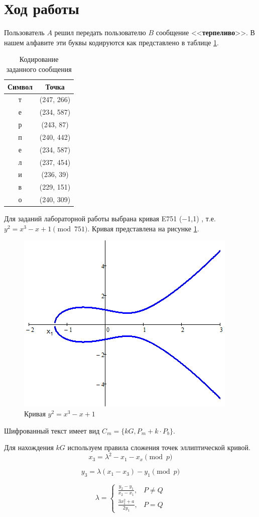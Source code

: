 \section{Ход работы}

Пользователь $A$ решил передать пользователю $B$ сообщение <<\textbf{терпеливо}>>. В нашем алфавите эти буквы кодируются как представлено в таблице \ref{tbl1}.

\begin{table}[H]
	\centering
	\caption{Кодирование заданного сообщения}
	\begin{tabular}{|c|c|}
		\hline
		Символ & Точка      \\ \hline
		т      & (247, 266) \\ \hline
		е      & (234, 587) \\ \hline
		р      & (243, 87)  \\ \hline
		п      & (240, 442) \\ \hline
		е      & (234, 587) \\ \hline
		л      & (237, 454) \\ \hline
		и      & (236, 39)  \\ \hline
		в      & (229, 151) \\ \hline
		о      & (240, 309) \\ \hline
	\end{tabular}
	\label{tbl1}
\end{table}

Для заданий лабораторной работы выбрана кривая E751 (−1,1) , т.е. $y^2 = x^3 − x +1 \pmod{751}$. Кривая представлена на рисунке \ref{fig:elcurve3}.

\begin{figure}[H]
	\centering
	\includegraphics[width=0.7\linewidth]{img/elCurve3}
	\caption{Кривая $y^2 = x^3 − x +1$}
	\label{fig:elcurve3}
\end{figure}


Шифрованный текст имеет вид $C_m = \{ kG, P_m + k \cdot P_b\}$.

Для нахождения $kG$ используем правила сложения точек эллиптической кривой.
\[
x_3 = \lambda^2 - x_1 - x_x \pmod{p} 
\]

\[
y_3 = \lambda(x_1-x_3) -y_1 \pmod{p}
\]


\[
\lambda = 
\begin{cases}
\frac{y_2-y_1}{x_2-x_1}, & P \neq Q\\
\frac{3x^2_1+a}{2y_1}, & P = Q
\end{cases}
\]